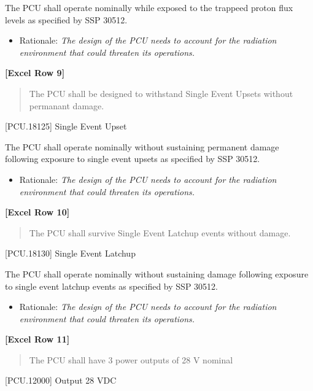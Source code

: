 The PCU shall operate nominally while exposed to the trappeed proton flux levels as specified by SSP 30512.

\begin{itemize}
\item{} Rationale: \emph{The design of the PCU needs to account for the radiation environment that could threaten its operations.}

\end{itemize}

\textbf{[Excel Row 9]}

\begin{quote}
The PCU shall be designed to withstand Single Event Upsets without permanant damage.
\end{quote}

[PCU.18125] Single Event Upset

The PCU shall operate nominally without sustaining permanent damage following exposure to single event upsets as specified by SSP 30512.

\begin{itemize}
\item{} Rationale: \emph{The design of the PCU needs to account for the radiation environment that could threaten its operations.}

\end{itemize}

\textbf{[Excel Row 10]}

\begin{quote}
The PCU shall survive Single Event Latchup events without damage.
\end{quote}

[PCU.18130] Single Event Latchup

The PCU shall operate nominally without sustaining damage following exposure to single event latchup events as specified by SSP 30512.

\begin{itemize}
\item{} Rationale: \emph{The design of the PCU needs to account for the radiation environment that could threaten its operations.}

\end{itemize}

\textbf{[Excel Row 11]}

\begin{quote}
The PCU shall have 3 power outputs of 28 V nominal
\end{quote}

[PCU.12000] Output 28 VDC


